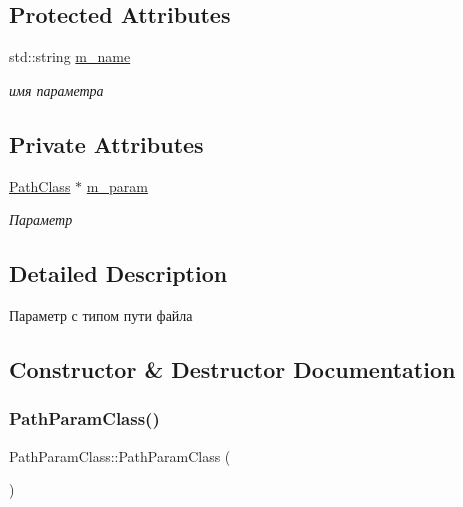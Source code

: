 \subsection*{Protected Attributes}
\begin{DoxyCompactItemize}
\item 
std\+::string \hyperlink{class_set_param_class_aab204889210304af482b414a6f8dbe82}{m\+\_\+name}
\begin{DoxyCompactList}\small\item\em имя параметра \end{DoxyCompactList}\end{DoxyCompactItemize}
\subsection*{Private Attributes}
\begin{DoxyCompactItemize}
\item 
\hyperlink{class_path_class}{Path\+Class} $\ast$ \hyperlink{class_path_param_class_a91c30c25a16f97df5dc77ac5c6de1d78}{m\+\_\+param}
\begin{DoxyCompactList}\small\item\em Параметр \end{DoxyCompactList}\end{DoxyCompactItemize}


\subsection{Detailed Description}
Параметр с типом пути файла 

\subsection{Constructor \& Destructor Documentation}
\mbox{\label{class_path_param_class_a145bffa31ef9b240e5fe2d49ace5550a}} 
\subsubsection{\texorpdfstring{Path\+Param\+Class()}{PathParamClass()}\hspace{0.1cm}{\footnotesize\ttfamily [1/2]}}
{\footnotesize\ttfamily Path\+Param\+Class\+::\+Path\+Param\+Class (\begin{DoxyParamCaption}{ }\end{DoxyParamCaption})}

